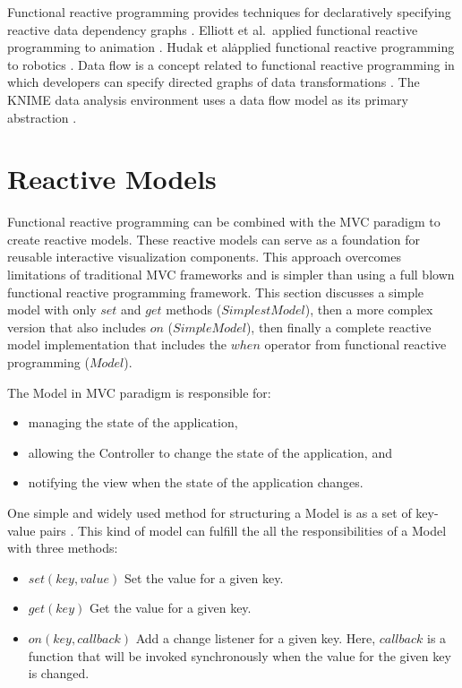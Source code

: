 Functional reactive programming provides techniques for declaratively specifying reactive data dependency graphs \cite{wan2000functional}. Elliott et al.\ applied functional reactive programming to animation \cite{elliott1997functional}. Hudak et al\. applied functional reactive programming to robotics \cite{hudak2003arrows}. Data flow is a concept related to functional reactive programming in which developers can specify directed graphs of data transformations \cite{halbwachs1991synchronous}. The KNIME data analysis environment uses a data flow model as its primary abstraction \cite{berthold2008knime}.

\section{Reactive Models} \label{reactiveModels}
Functional reactive programming can be combined with the MVC paradigm to create reactive models. These reactive models can serve as a foundation for reusable interactive visualization components. This approach overcomes limitations of traditional MVC frameworks and is simpler than using a full blown functional reactive programming framework. This section discusses a simple model with only $set$ and $get$ methods ($SimplestModel$), then a more complex version that also includes $on$ ($SimpleModel$), then finally a complete reactive model implementation that includes the $when$ operator from functional reactive programming ($Model$).

The Model in MVC paradigm is responsible for:
\begin{itemize}
\item managing the state of the application,
\item allowing the Controller to change the state of the application, and 
\item notifying the view when the state of the application changes.
\end{itemize}

One simple and widely used method for structuring a Model is as a set of key-value pairs \cite{leff2001web}. This kind of model can fulfill the all the responsibilities of a Model with three methods:

\begin{itemize}
\item $set(key, value)$ Set the value for a given key.
\item $get(key)$ Get the value for a given key.
\item $on(key, callback)$ Add a change listener for a given key. Here, $callback$ is a function that will be invoked synchronously when the value for the given key is changed.
\end{itemize}

